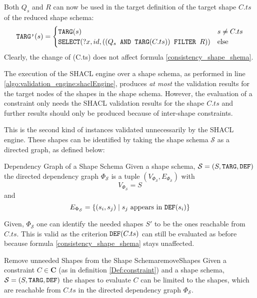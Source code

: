 Both $Q_s$ and $R$ can now be used in the target definition of the target shape $C.ts$ of the reduced shape schema:
\[
    \texttt{TARG'}(s) =    \begin{cases} 
                            \texttt{TARG}(s) & s \neq C.ts\\
    \texttt{SELECT}(?x,id,((Q_s \texttt{ AND } \texttt{TARG}(C.ts)) \texttt{ FILTER } R)) & \text{else}
                        \end{cases}
\]
Clearly, the change of (C.ts) does not affect formula \ref{consistency_shape_shema}.

The execution of the SHACL engine over a shape schema, as performed in line \ref{algo:validation_engine:shaclEngine}, produces \emph{at most} the validation results for the target nodes of the shapes in the shape schema. However, the evaluation of a constraint only needs the SHACL validation results for the shape $C.ts$ and further results should only be produced because of inter-shape constraints.

This is the second kind of instances validated unnecessarily by the SHACL engine. These shapes can be identified by taking the shape schema $\mathcal{S}$ as a directed graph, as defined below:

\begin{Def}{Dependency Graph of a Shape Schema \cite{figuera2021trav}}{}
    Given a shape schema, $\mathcal{S} = (S,\texttt{TARG},\texttt{DEF})$ the directed dependency graph $\Phi_\mathcal{S}$ is a tuple $(V_{\Phi_\mathcal{S}}, E_{\Phi_\mathcal{S}})$ with \[V_{\Phi_\mathcal{S}} = S\] and \[E_{\Phi_\mathcal{S}} = \{(s_i, s_j) \mid s_j \textrm{ appears in } \texttt{DEF}(s_i)\}\]
\end{Def}

Given, $\Phi_\mathcal{S}$ one can identify the needed shapes $S'$ to be the ones reachable from $C.ts$. This is valid as the criterion $\texttt{DEF}(C.ts)$ can still be evaluated as before because formula \ref{consistency_shape_shema} stays unaffected.

\begin{Satz}{Remove unneeded Shapes from the Shape Schema}{removeShapes}
    Given a constraint $C \in \mathbf{C}$ (as in definition \ref{Def:constraint}) and a shape schema, $\mathcal{S} = (S,\texttt{TARG},\texttt{DEF})$ the shapes to evaluate $C$ can be limited to the shapes, which are reachable from $C.ts$ in the directed dependency graph $\Phi_\mathcal{S}$.
\end{Satz}

